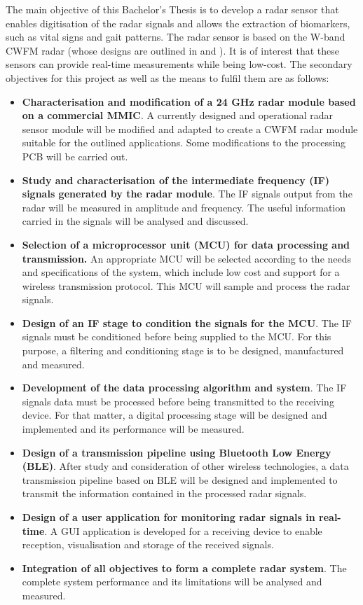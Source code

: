 	The main objective of this Bachelor's Thesis is to develop a radar sensor that enables digitisation of the radar signals and allows the extraction of biomarkers, such as vital signs and gait patterns. The radar sensor is based on the W-band CWFM radar (whose designs are  outlined in \cite{Sardinero2022} and \cite{Montesano2019}). It is of interest that these sensors can provide real-time measurements while being low-cost. The secondary objectives for this project as well as the means to fulfil them are as follows:
	\begin{itemize}
		\item \textbf{Characterisation and modification of a 24 GHz radar module based on a commercial MMIC}. A currently designed and operational radar sensor module will be modified and adapted to create a CWFM radar module suitable for the outlined applications. Some modifications to the processing PCB will be carried out.
		\item \textbf{Study and characterisation of the intermediate frequency (IF) signals generated by the radar module}. The IF signals output from the radar will be measured in amplitude and frequency. The useful information carried in the signals will be analysed and discussed.
		\item \textbf{Selection of a microprocessor unit (MCU) for data processing and transmission.} An appropriate MCU will be selected according to the needs and specifications of the system, which include low cost and support for a wireless transmission protocol. This MCU will sample and process the radar signals.
		\item \textbf{Design of an IF stage to condition the signals for the MCU}. The IF signals must be conditioned before being supplied to the MCU. For this purpose, a filtering and conditioning stage is to be designed, manufactured and measured.
		\item \textbf{Development of the data processing algorithm and system}. The IF signals data must be processed before being transmitted to the receiving device. For that matter, a digital processing stage will be designed and implemented and its performance will be measured.
		\item \textbf{Design of a transmission pipeline using Bluetooth Low Energy (BLE)}. After study and consideration of other wireless technologies, a data transmission pipeline based on BLE will be designed and implemented to transmit the information contained in the processed radar signals.
		\item \textbf{Design of a user application for monitoring radar signals in real-time}. A GUI application is developed for a receiving device to enable reception, visualisation and storage of the received signals.
		\item \textbf{Integration of all objectives to form a complete radar system}. The complete system performance and its limitations will be analysed and measured.
	\end{itemize}
	

